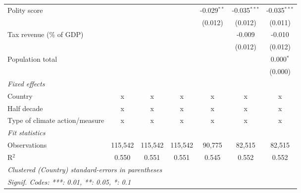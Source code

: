\begin{tabular}{lcccccc}
   Polity score                                                       &                &               &               & -0.029$^{**}$ & -0.035$^{***}$ & -0.035$^{***}$\\   
                                                                      &                &               &               & (0.012)       & (0.012)        & (0.011)\\   
   Tax revenue (\% of GDP)                                            &                &               &               &               & -0.009         & -0.010\\   
                                                                      &                &               &               &               & (0.012)        & (0.012)\\   
   Population total                                                   &                &               &               &               &                & 0.000$^{*}$\\   
                                                                      &                &               &               &               &                & (0.000)\\   
   \emph{Fixed effects}\\
   Country                                                            & x              & x             & x             & x             & x              & x\\  
   Half decade                                                        & x              & x             & x             & x             & x              & x\\  
   Type of climate action/measure                                     & x              & x             & x             & x             & x              & x\\  
   \midrule \emph{Fit statistics}\\
   Observations                                                       & 115,542        & 115,542       & 115,542       & 90,775        & 82,515         & 82,515\\  
   R$^2$                                                              & 0.550          & 0.551         & 0.551         & 0.545         & 0.552          & 0.552\\  
   \midrule
   \multicolumn{7}{l}{\emph{Clustered (Country) standard-errors in parentheses}}\\
   \multicolumn{7}{l}{\emph{Signif. Codes: ***: 0.01, **: 0.05, *: 0.1}}\\
\end{tabular}
\par\endgroup


